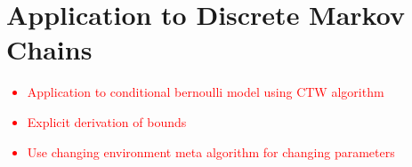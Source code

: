 \section{Application to Discrete Markov Chains}

\textcolor{red}
{\begin{itemize}
    \item Application to conditional bernoulli model using CTW algorithm
    \item Explicit derivation of bounds
    \item Use changing environment meta algorithm for changing parameters
\end{itemize}}